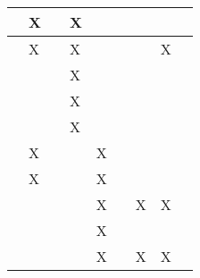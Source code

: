 \begin{longtable}{|l|llllllll|}
    \cite[]{Brockman.2016}        & \multicolumn{1}{l|}{X}   & \multicolumn{1}{l|}{}    & \multicolumn{1}{l|}{X}   & \multicolumn{1}{l|}{}   & \multicolumn{1}{l|}{}   & \multicolumn{1}{l|}{}   & \multicolumn{1}{l|}{}      \\ \hline
    \cite[]{YanDuan.2016}         & \multicolumn{1}{l|}{X}   & \multicolumn{1}{l|}{}    & \multicolumn{1}{l|}{X}   & \multicolumn{1}{l|}{}   & \multicolumn{1}{l|}{}   & \multicolumn{1}{l|}{}   & \multicolumn{1}{l|}{X}      \\ \hline
    \cite[]{Ivaldi.2272014}       & \multicolumn{1}{l|}{}   & \multicolumn{1}{l|}{}    & \multicolumn{1}{l|}{X}   & \multicolumn{1}{l|}{}   & \multicolumn{1}{l|}{}   & \multicolumn{1}{l|}{}   & \multicolumn{1}{l|}{}      \\ \hline
    \cite[]{Ayala.2020}           & \multicolumn{1}{l|}{}   & \multicolumn{1}{l|}{}    & \multicolumn{1}{l|}{X}   & \multicolumn{1}{l|}{}   & \multicolumn{1}{l|}{}   & \multicolumn{1}{l|}{}   & \multicolumn{1}{l|}{}      \\ \hline
    \cite[]{Todorov.2012}         & \multicolumn{1}{l|}{}   & \multicolumn{1}{l|}{}    & \multicolumn{1}{l|}{X}   & \multicolumn{1}{l|}{}   & \multicolumn{1}{l|}{}   & \multicolumn{1}{l|}{}   & \multicolumn{1}{l|}{}      \\ \hline
    \cite[]{Koch.2018}            & \multicolumn{1}{l|}{X}   & \multicolumn{1}{l|}{}    & \multicolumn{1}{l|}{}   & \multicolumn{1}{l|}{X}   & \multicolumn{1}{l|}{}   & \multicolumn{1}{l|}{}   & \multicolumn{1}{l|}{}      \\ \hline
    \cite[]{Deshpande.2020}       & \multicolumn{1}{l|}{X}   & \multicolumn{1}{l|}{}    & \multicolumn{1}{l|}{}   & \multicolumn{1}{l|}{X}   & \multicolumn{1}{l|}{}   & \multicolumn{1}{l|}{}   & \multicolumn{1}{l|}{}      \\ \hline
    \cite[]{Deshpande.2021}       & \multicolumn{1}{l|}{}   & \multicolumn{1}{l|}{}    & \multicolumn{1}{l|}{}   & \multicolumn{1}{l|}{X}   & \multicolumn{1}{l|}{}   & \multicolumn{1}{l|}{X}   & \multicolumn{1}{l|}{X}      \\ \hline
    \cite[]{Hentati.2018}         & \multicolumn{1}{l|}{}   & \multicolumn{1}{l|}{}    & \multicolumn{1}{l|}{}   & \multicolumn{1}{l|}{X}   & \multicolumn{1}{l|}{}   & \multicolumn{1}{l|}{}   & \multicolumn{1}{l|}{}      \\ \hline
    \cite[]{Molchanov.2019}       & \multicolumn{1}{l|}{}   & \multicolumn{1}{l|}{}    & \multicolumn{1}{l|}{}   & \multicolumn{1}{l|}{X}   & \multicolumn{1}{l|}{}   & \multicolumn{1}{l|}{X}   & \multicolumn{1}{l|}{X}      \\ \hline

\end{longtable}
